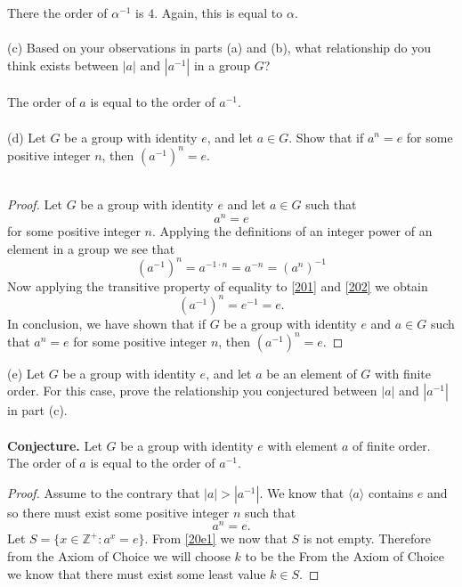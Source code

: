 \documentclass[11pt,a4paper]{article}
\begin{document}
There the order of $\alpha^{-1}$ is $4$. Again, this is equal to $\alpha$.\\
~\\
(c) Based on your observations in parts (a) and (b), what relationship do you
think exists between $|a|$ and $|a^{-1}|$ in a group $G$?\\
~\\
The order of $a$ is equal to the order of $a^{-1}$.\\
~\\
(d) Let $G$ be a group with identity $e$, and let $a \in G$. Show that if $a^n = e$ for
some positive integer $n$, then $(a^{-1})^n = e$.\\
~\\
\begin{proof}
Let $G$ be a group with identity $e$ and let $a \in G$ such that 
\begin{equation}\label{201}
a^n = e
\end{equation}
for some positive integer $n$. Applying the definitions of an integer power of an element in a group we see that 
\begin{equation}\label{202}
(a^{-1})^n = a^{-1\cdot n} = a^{-n} = (a^n)^{-1}
\end{equation}
Now applying the transitive property of equality to \eqref{201} and \eqref{202} we obtain
\[
(a^{-1})^n = e^{-1} = e.
\]
In conclusion, we have shown that if $G$ be a group with identity $e$ and $a \in G$ such that $a^n = e$ for some positive integer $n$, then $(a^{-1})^n = e$.
\end{proof}
(e) Let $G$ be a group with identity $e$, and let $a$ be an element of $G$ with finite
order. For this case, prove the relationship you conjectured between $|a|$
and $|a^{-1}|$ in part (c).\\
~\\
{\bf Conjecture.}  Let $G$ be a group with identity $e$ with element $a$ of finite order. The order of $a$ is equal to the order of $a^{-1}$.
\begin{proof}
Assume to the contrary that $|a|>|a^{-1}|$. We know that $\langle a \rangle$ contains $e$ and so there must exist some positive integer $n$ such that
\begin{equation}\label{20e1}
a^n = e.
\end{equation}
Let $S=\{x\in\mathbb{Z}^+:a^x=e\}$. From \eqref{20e1} we now that $S$ is not empty. Therefore from the Axiom of Choice we will choose $k$ to be the 
From the Axiom of Choice we know that there must exist some least value $k\in S$. 
\end{proof}
\end{document}
